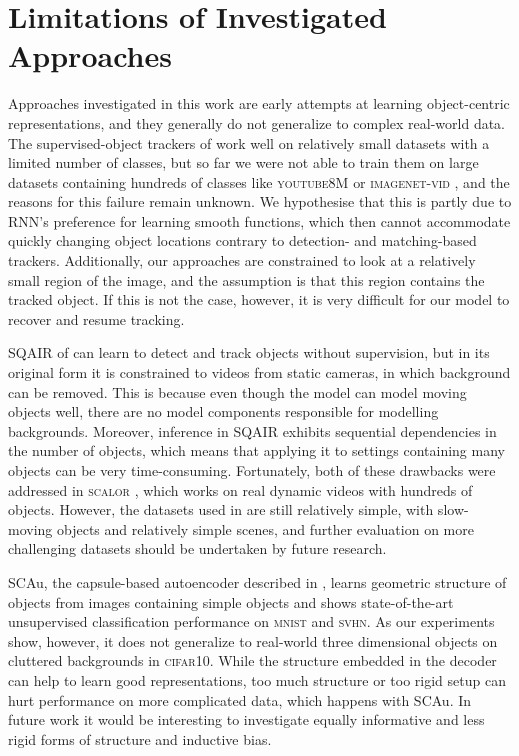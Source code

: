 \section{Limitations of Investigated Approaches}
Approaches investigated in this work are early attempts at learning object-centric representations, and they generally do not generalize to complex real-world data.
The supervised-object trackers of  work well on relatively small datasets with a limited number of classes, but so far we were not able to train them on large datasets containing hundreds of classes like \textsc{youtube8M} \citep{AbuElHaija2016y8m} or \textsc{imagenet-vid} \citep{Russakovsky2014imagenet}, and the reasons for this failure remain unknown.
We hypothesise that this is partly due to \gls{RNN}'s preference for learning smooth functions, which then cannot accommodate quickly changing object locations contrary to detection- and matching-based trackers. 
Additionally, our approaches are constrained to look at a relatively small region of the image, and the assumption is that this region contains the tracked object.
If this is not the case, however, it is very difficult for our model to recover and resume tracking.

\Gls{SQAIR} of  can learn to detect and track objects without supervision, but in its original form it is constrained to videos from static cameras, in which background can be removed. 
This is because even though the model can model moving objects well, there are no model components responsible for modelling backgrounds.
Moreover, inference in \gls{SQAIR} exhibits sequential dependencies in the number of objects, which means that applying it to settings containing many objects can be very time-consuming.
Fortunately, both of these drawbacks were addressed in \textsc{scalor} \citep{Jiang2019scalor}, which works on real dynamic videos with hundreds of objects.
However, the datasets used in \cite{Jiang2019scalor} are still relatively simple, with slow-moving objects and relatively simple scenes, and further evaluation on more challenging datasets should be undertaken by future research.

\Gls{SCAu}, the capsule-based autoencoder described in , learns geometric structure of objects from images containing simple objects and shows state-of-the-art unsupervised classification performance on \textsc{mnist} and \textsc{svhn}.
As our experiments show, however, it does not generalize to real-world three dimensional objects on cluttered backgrounds in \textsc{cifar10}.
While the structure embedded in the decoder can help to learn good representations, too much structure or too rigid setup can hurt performance on more complicated data, which happens with \gls{SCAu}.
In future work it would be interesting to investigate equally informative and less rigid forms of structure and inductive bias.

